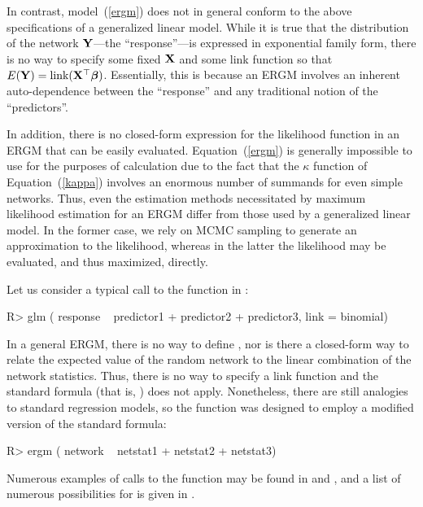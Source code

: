 \documentclass[nojss]{jss}
\def\vec#1{\mathchoice{\mbox{\boldmath$\displaystyle\bf#1$}}
{\mbox{\boldmath$\textstyle\bf#1$}}
{\mbox{\boldmath$\scriptstyle\bf#1$}}
{\mbox{\boldmath$\scriptscriptstyle\bf#1$}}}
\begin{document}
In contrast, model~(\ref{ergm}) does not in general conform to the above
specifications of a generalized linear model.  While it is true that the distribution of
the network $\vec Y$---the ``response''---is expressed in exponential family
form, there is no way to specify some fixed $\vec X$ and some link function so that
$E(\vec Y)= \mbox{link}(\vec X^\top \vec\beta)$.  Essentially, this is because
an ERGM involves an inherent auto-dependence between the ``response'' and
any traditional notion of the ``predictors''.

In addition, there is
no closed-form expression for the likelihood function in an ERGM that
can be easily evaluated.  Equation~(\ref{ergm}) is generally impossible
to use for the purposes of calculation due to the fact that
the $\kappa$ function of Equation~(\ref{kappa}) involves an enormous number
of summands for even simple networks.  Thus, even the estimation methods
necessitated by maximum likelihood estimation for an ERGM differ from those
used by a generalized linear model.  In the former case, we rely on MCMC
sampling to generate an approximation to the likelihood, whereas in the
latter the likelihood may be evaluated, and thus maximized, directly.

Let us consider a typical call to the  function in :
\begin{CodeChunk}
\begin{CodeInput}
R> glm ( response ~ predictor1 + predictor2 + predictor3, link = binomial)
\end{CodeInput}
\end{CodeChunk}
In a general ERGM, there
is no way to define ,
nor is there a closed-form way to relate the expected value of the random
network to the linear combination of the network statistics.  Thus, there is
no way to specify a link function and the standard  formula
(that is, ) does not apply.  Nonetheless, there
are still analogies to standard regression models, so the
 function was designed to employ a modified version of the
standard  formula:
\begin{CodeChunk}
\begin{CodeInput}
R> ergm ( network ~ netstat1 + netstat2 + netstat3)
\end{CodeInput}
\end{CodeChunk}
Numerous examples of calls to the  function may be found in
\citet{ergmjss} and \citet{statnettutorialjss}, and a list of numerous possibilities
for  is given in \citet{ergmtermsjss}.
\end{document}
